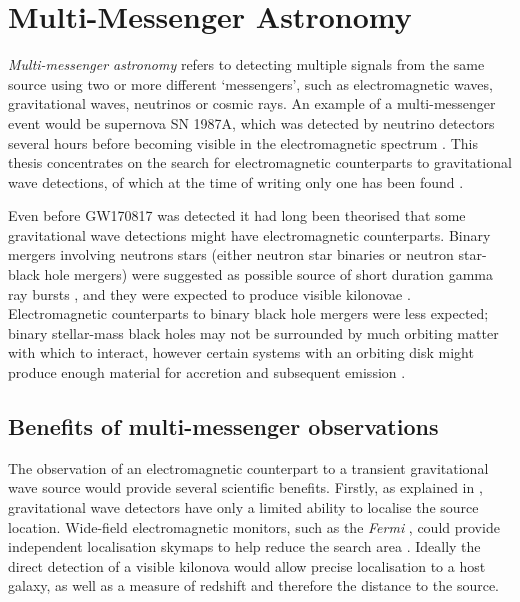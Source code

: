 \section{Multi-Messenger Astronomy}
\label{sec:multi}
\begin{colsection}


\begin{colsection}

\emph{Multi-messenger astronomy} refers to detecting multiple signals from the same source using two or more different `messengers', such as electromagnetic waves, gravitational waves, neutrinos or cosmic rays. An example of a multi-messenger event would be supernova SN 1987A, which was detected by neutrino detectors several hours before becoming visible in the electromagnetic spectrum \citep{SN1987A}. This thesis concentrates on the search for electromagnetic counterparts to gravitational wave detections, of which at the time of writing only one has been found \citep[GW170817;][]{GW170817}.

Even before GW170817 was detected it had long been theorised that some gravitational wave detections might have electromagnetic counterparts. Binary mergers involving neutrons stars (either neutron star binaries or neutron star-black hole mergers) were suggested as possible source of short duration gamma ray bursts \citep{SGRBs}, and they were expected to produce visible kilonovae \citep{BNSNSBH_EM, BNS_EM}. Electromagnetic counterparts to binary black hole mergers were less expected; binary stellar-mass black holes may not be surrounded by much orbiting matter with which to interact, however certain systems with an orbiting disk might produce enough material for accretion and subsequent emission \citep{BBH_EM}.

\end{colsection}


\subsection{Benefits of multi-messenger observations}
\label{sec:mma_benefits}
\begin{colsection}

The observation of an electromagnetic counterpart to a transient gravitational wave source would provide several scientific benefits. Firstly, as explained in , gravitational wave detectors have only a limited ability to localise the source location. Wide-field electromagnetic monitors, such as the \textit{Fermi} , could provide independent localisation skymaps to help reduce the search area \citep[note the \textit{Fermi} skymap included in ]{GW170817_GRB}. Ideally the direct detection of a visible kilonova would allow precise localisation to a host galaxy, as well as a measure of redshift and therefore the distance to the source.


\end{colsection}
\end{colsection}
